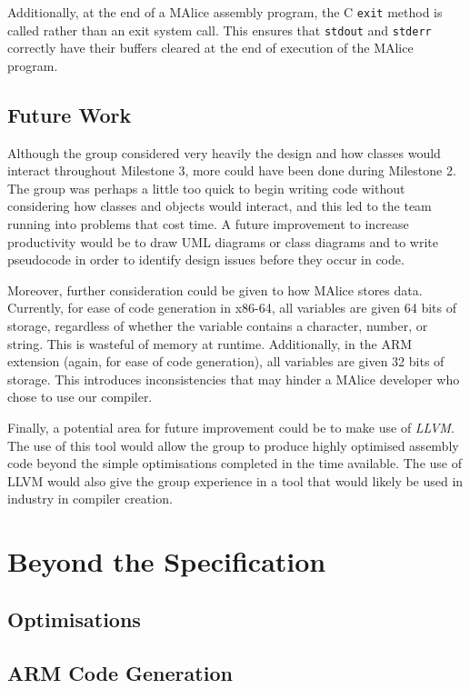 \documentclass[a4wide, 11pt]{article}
\begin{document}
Additionally, at the end of a MAlice assembly program, the C \texttt{exit} 
method is called rather than an exit system call. This ensures that 
\texttt{stdout} and \texttt{stderr} correctly have their buffers cleared at the
end of execution of the MAlice program.

\subsection{Future Work}

Although the group considered very heavily the design and how classes would
interact throughout Milestone 3, more could have been done during Milestone 2.
The group was perhaps a little too quick to begin writing code without 
considering how classes and objects would interact, and this led to the team 
running into problems that cost time. A future improvement to increase 
productivity would be to draw UML diagrams or class diagrams and to write
pseudocode in order to identify design issues before they occur in code.

Moreover, further consideration could be given to how MAlice stores data. 
Currently, for ease of code generation in x86-64, all variables are given
64 bits of storage, regardless of whether the variable contains a character,
number, or string. This is wasteful of memory at runtime. Additionally, in the
ARM extension (again, for ease of code generation), all variables are given
32 bits of storage. This introduces inconsistencies that may hinder a MAlice
developer who chose to use our compiler.

Finally, a potential area for future improvement could be to make use of
\emph{LLVM}. The use of this tool would allow the group to produce highly
optimised assembly code beyond the simple optimisations completed in the time
available. The use of LLVM would also give the group experience in a tool that
would likely be used in industry in compiler creation.

\section{Beyond the Specification}

\subsection{Optimisations}

\subsection{ARM Code Generation}
\end{document}
